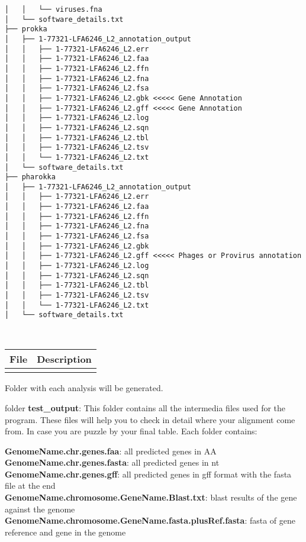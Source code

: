 \documentclass[
]{book}
\begin{document}
\begin{verbatim}
│   │   └── viruses.fna
│   └── software_details.txt
├── prokka
│   ├── 1-77321-LFA6246_L2_annotation_output
│   │   ├── 1-77321-LFA6246_L2.err
│   │   ├── 1-77321-LFA6246_L2.faa
│   │   ├── 1-77321-LFA6246_L2.ffn
│   │   ├── 1-77321-LFA6246_L2.fna
│   │   ├── 1-77321-LFA6246_L2.fsa
│   │   ├── 1-77321-LFA6246_L2.gbk <<<<< Gene Annotation
│   │   ├── 1-77321-LFA6246_L2.gff <<<<< Gene Annotation
│   │   ├── 1-77321-LFA6246_L2.log
│   │   ├── 1-77321-LFA6246_L2.sqn
│   │   ├── 1-77321-LFA6246_L2.tbl
│   │   ├── 1-77321-LFA6246_L2.tsv
│   │   └── 1-77321-LFA6246_L2.txt
│   └── software_details.txt
├── pharokka
│   ├── 1-77321-LFA6246_L2_annotation_output
│   │   ├── 1-77321-LFA6246_L2.err
│   │   ├── 1-77321-LFA6246_L2.faa
│   │   ├── 1-77321-LFA6246_L2.ffn
│   │   ├── 1-77321-LFA6246_L2.fna
│   │   ├── 1-77321-LFA6246_L2.fsa
│   │   ├── 1-77321-LFA6246_L2.gbk
│   │   ├── 1-77321-LFA6246_L2.gff <<<<< Phages or Provirus annotation
│   │   ├── 1-77321-LFA6246_L2.log
│   │   ├── 1-77321-LFA6246_L2.sqn
│   │   ├── 1-77321-LFA6246_L2.tbl
│   │   ├── 1-77321-LFA6246_L2.tsv
│   │   └── 1-77321-LFA6246_L2.txt
│   └── software_details.txt

  
\end{verbatim}

\begin{longtable}[]{@{}ll@{}}
\toprule\noalign{}
File & Description \\
\midrule\noalign{}
\endhead
\bottomrule\noalign{}
\endlastfoot
& \\
\end{longtable}

Folder with each analysis will be generated.

folder \textbf{test\_output}:
This folder contains all the intermedia files used for the program. These files will help you to check in detail where your alignment come from. In case you are puzzle by your final table. Each folder contains:

\textbf{GenomeName.chr.genes.faa}: all predicted genes in AA\\
\textbf{GenomeName.chr.genes.fasta}: all predicted genes in nt\\
\textbf{GenomeName.chr.genes.gff}: all predicted genes in gff format with the fasta file at the end\\
\textbf{GenomeName.chromosome.GeneName.Blast.txt}: blast results of the gene against the genome\\
\textbf{GenomeName.chromosome.GeneName.fasta.plusRef.fasta}: fasta of gene reference and gene in the genome
\end{document}
